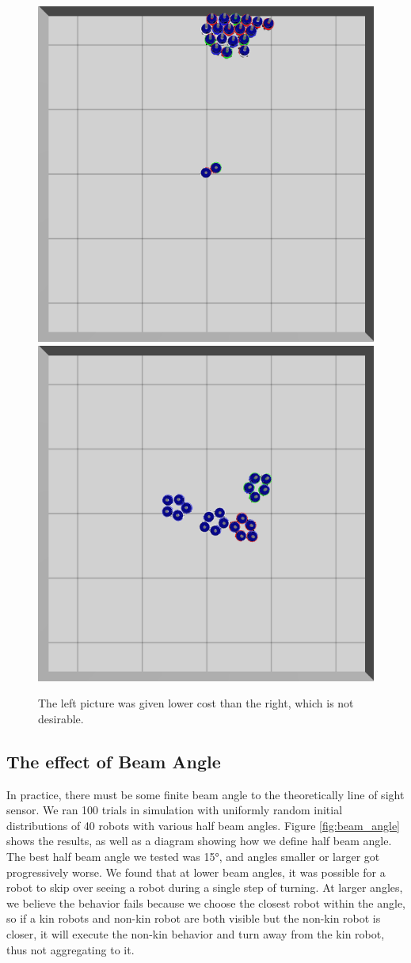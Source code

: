 \documentclass[conference]{IEEEtran}
\begin{document}
    \begin{figure}[H]
      \centering
      \includegraphics[width=0.49\linewidth]{./images/individual_0_gen_0.png}
      \includegraphics[width=0.49\linewidth]{./images/individual_0_gen_1_better.png}
      \caption{The left picture was given lower cost than the right, which is not desirable.}
      \label{fig:cost_function_fuckup}
    \end{figure}

  \subsection{The effect of Beam Angle} \label{section:beam_angle}

    In practice, there must be some finite beam angle to the theoretically line of sight sensor. We ran 100 trials in simulation with uniformly random initial distributions of 40 robots with various half beam angles. Figure \ref{fig:beam_angle} shows the results, as well as a diagram showing how we define half beam angle. The best half beam angle we tested was \ang{15}, and angles smaller or larger got progressively worse. We found that at lower beam angles, it was possible for a robot to skip over seeing a robot during a single step of turning. At larger angles, we believe the behavior fails because we choose the closest robot within the angle, so if a kin robots and non-kin robot are both visible but the non-kin robot is closer, it will execute the non-kin behavior and turn away from the kin robot, thus not aggregating to it.
\end{document}

